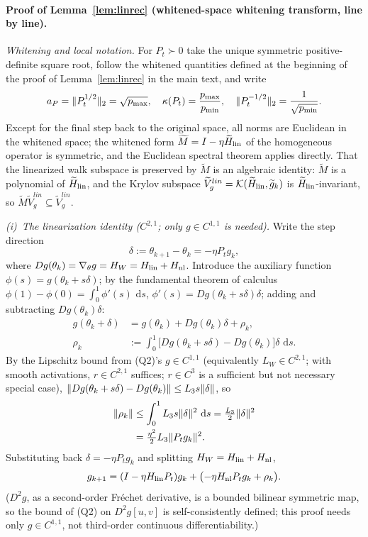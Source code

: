 \documentclass[11pt]{article}
\DeclarePairedDelimiter{\norm}{\lVert}{\rVert}
\newcommand{\W}{W}
\newcommand{\wt}[1]{\widetilde{#1}}
\newcommand{\dd}{\,\mathrm d}
\numberwithin{equation}{section}
\begin{document}
\paragraph{Proof of Lemma~\ref{lem:linrec} (whitened-space whitening transform, line by line).}
\emph{Whitening and local notation.} For $P_t\succ0$ take the unique symmetric positive-definite square root, follow the whitened quantities defined at the beginning of the proof of Lemma~\ref{lem:linrec} in the main text, and write
\begin{equation}
a_P=\norm{P_t^{1/2}}_2=\sqrt{p_{\max}},\quad
\kappa(P_t)=\frac{p_{\max}}{p_{\min}},\quad
\norm{P_t^{-1/2}}_2=\frac1{\sqrt{p_{\min}}}.
\end{equation}
Except for the final step back to the original space, all norms are Euclidean in the whitened space; the whitened form $\wt M=I-\eta\wt H_{\rm lin}$ of the homogeneous operator is symmetric, and the Euclidean spectral theorem applies directly. That the linearized walk subspace is preserved by $\wt M$ is an algebraic identity: $\wt M$ is a polynomial of $\wt H_{\rm lin}$, and the Krylov subspace $\wt V_g^{lin}=\mathcal K(\wt H_{\rm lin},\wt g_k)$ is $\wt H_{\rm lin}$-invariant, so $\wt M\wt V_g^{lin}\subseteq\wt V_g^{lin}$.

\medskip
\emph{(i)~The linearization identity ($C^{2,1}$; only $g\in C^{1,1}$ is needed).} Write the step direction
\begin{equation}
\delta:=\theta_{k+1}-\theta_k=-\eta P_tg_k,
\end{equation}
where $Dg(\theta_k)=\nabla_\theta g=H_{\W}=H_{\rm lin}+H_{\rm nl}$. Introduce the auxiliary function $\phi(s)=g(\theta_k+s\delta)$; by the fundamental theorem of calculus $\phi(1)-\phi(0)=\int_0^1\phi'(s)\,\dd s$, $\phi'(s)=Dg(\theta_k+s\delta)\delta$; adding and subtracting $Dg(\theta_k)\delta$:
\begin{align}
g(\theta_k+\delta)&=g(\theta_k)+Dg(\theta_k)\delta+\rho_k,\\
\rho_k&:=\int_0^1\bigl[Dg(\theta_k+s\delta)-Dg(\theta_k)\bigr]\delta\,\dd s.
\end{align}
By the Lipschitz bound from (Q2)'s $g\in C^{1,1}$ (equivalently $L_{\W}\in C^{2,1}$; with smooth activations, $r\in C^{2,1}$ suffices; $r\in C^3$ is a sufficient but not necessary special case), $\norm{Dg(\theta_k+s\delta)-Dg(\theta_k)}\le L_3s\norm\delta$, so
\begin{align}
\norm{\rho_k}
&\le\int_0^1 L_3s\norm\delta^2\,\dd s=\tfrac{L_3}{2}\norm\delta^2\notag\\
&=\tfrac{\eta^2}{2}L_3\norm{P_tg_k}^2.
\end{align}
Substituting back $\delta=-\eta P_tg_k$ and splitting $H_{\W}=H_{\rm lin}+H_{\rm nl}$,
\begin{equation}
g_{k+1}=(I-\eta H_{\rm lin}P_t)g_k+\bigl(-\eta H_{\rm nl}P_tg_k+\rho_k\bigr).
\end{equation}
($D^2g$, as a second-order Fr\'echet derivative, is a bounded bilinear symmetric map, so the bound of (Q2) on $D^2g[u,v]$ is self-consistently defined; this proof needs only $g\in C^{1,1}$, not third-order continuous differentiability.)
\end{document}
